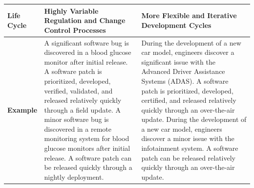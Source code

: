 \documentclass[conference]{IEEEtran}
\begin{document}
\begin{table}[t]
\begin{tabular}{|p{2.5cm}|p{6.5cm}|p{6.5cm}|}
    \textbf{Life Cycle}      & Highly Variable Regulation and Change Control Processes                                                                                                                                                                                                                                                                                                                                                        & More Flexible and Iterative Development Cycles                                                                                                                                                                                                                                                                                                                                                                                                              \\ \hline
    \textbf{Example}         & A significant software bug is discovered in a blood glucose monitor after initial release. A software patch is prioritized, developed, verified, validated, and released relatively quickly through a field update. A minor software bug is discovered in a remote monitoring system for blood glucose monitors after initial release.  A software patch can be released quickly through a nightly deployment. & During the development of a new car model, engineers discover a significant issue with the Advanced Driver Assistance Systems (ADAS).  A software patch is prioritized, developed, certified, and released relatively quickly through an over-the-air update. During the development of a new car model, engineers discover a minor issue with the infotainment system. A software patch can be released relatively quickly through an over-the-air update. \\ \hline
    \end{tabular}
    \end{table}
\end{document}
